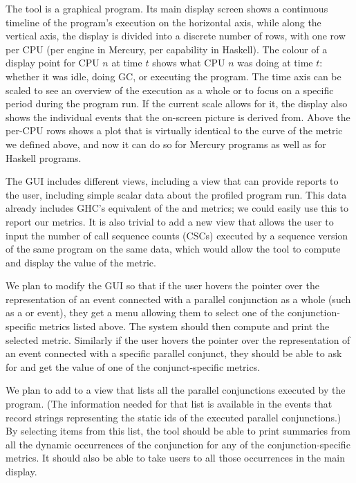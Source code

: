 The \tscope tool is a graphical program.
Its main display screen shows
a continuous timeline of the program's execution on the horizontal axis,
while along the vertical axis,
the display is divided into a discrete number of rows,
with one row per CPU (per engine in Mercury, per capability in Haskell).
The colour of a display point for CPU $n$ at time $t$
shows what CPU $n$ was doing at time $t$:
whether it was idle, doing GC, or executing the program.
The time axis can be scaled to see an overview of the execution as a whole
or to focus on a specific period during the program run.
If the current scale allows for it,
the display also shows the individual events
that the on-screen picture is derived from.
Above the per-CPU rows \tscope shows a plot that is virtually identical
to the curve of the  metric we defined above,
and now it can do so for Mercury programs as well as for Haskell programs.

The \tscope GUI includes different views, including a view that can provide
reports to the user,
including simple scalar data about the profiled program run.
This data already includes GHC's equivalent of the 
and  metrics;
we could easily use this to report our metrics.
It is also trivial to add a new view that allows the user to input
the number of call sequence counts (CSCs)
executed by a sequence version of the same program on the same data,
which would allow the tool to compute and display
the value of the  metric.

We plan to modify the \tscope GUI so that
if the user hovers the pointer over the representation
of an event connected with a parallel conjunction as a whole
(such as a  or
 event),
they get a menu allowing them to select
one of the conjunction-specific metrics listed above.
The system should then compute and print the selected metric.
Similarly if the user hovers the pointer over the representation
of an event connected with a specific parallel conjunct,
they should be able to ask for and get
the value of one of the conjunct-specific metrics.

We plan to add to \tscope a view
that lists all the parallel conjunctions executed by the program.
(The information needed for that list is available in the 
events that record strings representing the static ids of the executed
parallel conjunctions.)
By selecting items from this list,
the tool should be able to print summaries
from all the dynamic occurrences of the conjunction
for any of the conjunction-specific metrics.
It should also be able to take users
to all those occurrences in the main display.

